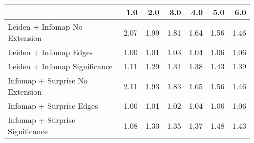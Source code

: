 \begin{tabular}{lrrrrrr}
\toprule
{} &  1.0 &  2.0 &  3.0 &  4.0 &  5.0 &  6.0 \\
\midrule
Leiden + Infomap No Extension   & 2.07 & 1.99 & 1.81 & 1.64 & 1.56 & 1.46 \\
Leiden + Infomap Edges          & 1.00 & 1.01 & 1.03 & 1.04 & 1.06 & 1.06 \\
Leiden + Infomap Significance   & 1.11 & 1.29 & 1.31 & 1.38 & 1.43 & 1.39 \\
Infomap + Surprise No Extension & 2.11 & 1.93 & 1.83 & 1.65 & 1.56 & 1.46 \\
Infomap + Surprise Edges        & 1.00 & 1.01 & 1.02 & 1.04 & 1.06 & 1.06 \\
Infomap + Surprise Significance & 1.08 & 1.30 & 1.35 & 1.37 & 1.48 & 1.43 \\
\bottomrule
\end{tabular}
